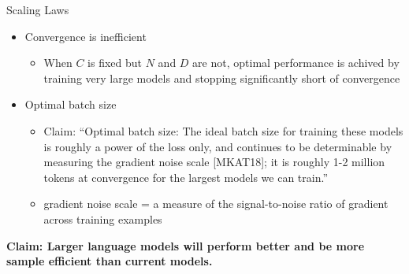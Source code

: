 
\begin{vbframe}{Scaling Laws}

\vfill

\begin{itemize}

	\item Convergence is inefficient
	\begin{itemize}
	\item When $C$ is fixed but $N$ and $D$ are not, optimal performance is achived by training very large models and stopping significantly short of convergence  
	\end{itemize}

	\item Optimal batch size
	\begin{itemize}
    	\item Claim: “Optimal batch size: The ideal batch size for training these
                models is roughly a power of the loss only, and continues to
                be determinable by measuring the gradient noise scale
                [MKAT18]; it is roughly 1-2 million tokens at convergence for
                the largest models we can train.”
    	\item gradient noise scale = a measure of the signal-to-noise ratio
            of gradient across training examples
	\end{itemize}

\end{itemize}

\vskip3mm

\textbf{Claim: Larger language models will perform better and be more sample efficient than current models.} 

\vfill

\end{vbframe}


